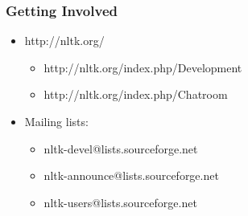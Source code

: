 \documentclass{beamer}             %
\begin{document}
\begin{frame}
  \frametitle{Getting Involved}
  \begin{itemize}
  \item http://nltk.org/
    \begin{itemize}
    \item http://nltk.org/index.php/Development
    \item http://nltk.org/index.php/Chatroom
    \end{itemize}
  \item Mailing lists:
    \begin{itemize}
    \item nltk-devel@lists.sourceforge.net
    \item nltk-announce@lists.sourceforge.net
    \item nltk-users@lists.sourceforge.net
    \end{itemize}
  \end{itemize}
\end{frame}

\end{document}
